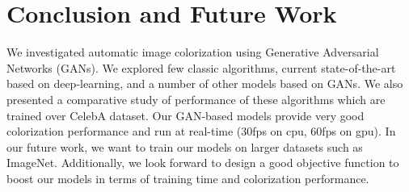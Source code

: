 \documentclass[10pt]{article}
\begin{document}
\section{Conclusion and Future Work}
We investigated automatic image colorization using Generative Adversarial Networks (GANs). 
We explored few classic algorithms, current state-of-the-art based on deep-learning, and a number of other models based on GANs. 
We also presented a comparative study of performance of these algorithms which are trained over CelebA dataset. 
Our GAN-based models provide very good colorization performance and run at real-time ($30$fps on cpu, $60$fps on gpu). 
In our future work, we want to train our models on larger datasets such as ImageNet. 
Additionally, we look forward to design a good objective function to boost our models in terms of training time and colorization performance.

\vspace{1mm}

\footnotesize

\end{document}
